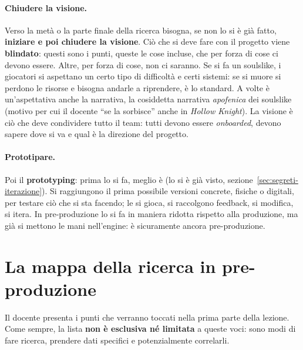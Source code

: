 \paragraph{Chiudere la visione.} Verso la metà o la parte finale della
ricerca bisogna, se non lo si è già fatto, \textbf{iniziare e poi chiudere la
visione}. Ciò che si deve fare con il progetto viene \textbf{blindato}:
questi sono i punti, queste le cose incluse, che per forza di cose ci devono
essere. Altre, per forza di cose, non ci saranno. Se si fa un soulslike, i
giocatori si aspettano un certo tipo di difficoltà e certi sistemi: se si
muore si perdono le risorse e bisogna andarle a riprendere, è lo standard. A
volte è un'aspettativa anche la narrativa, la cosiddetta narrativa
\emph{apofenica} dei soulslike (motivo per cui il docente ``se la sorbisce''
anche in \emph{Hollow Knight}). La visione è ciò che deve condividere tutto il
team: tutti devono essere \emph{onboarded}, devono sapere dove si va e qual è
la direzione del progetto.

\paragraph{Prototipare.} Poi il \textbf{prototyping}: prima lo si fa, meglio
è (lo si è già visto, sezione~\ref{sec:segreti-iterazione}). Si raggiungono il
prima possibile versioni concrete, fisiche o digitali, per testare ciò che si
sta facendo; le si gioca, si raccolgono feedback, si modifica, si itera. In
pre-produzione lo si fa in maniera ridotta rispetto alla produzione, ma già si
mettono le mani nell'engine: è sicuramente ancora pre-produzione.

\section{La mappa della ricerca in pre-produzione}
\label{sec:mappa-ricerca}

Il docente presenta i punti che verranno toccati nella prima parte della
lezione. Come sempre, la lista \textbf{non è esclusiva né limitata} a queste
voci: sono modi di fare ricerca, prendere dati specifici e potenzialmente
correlarli.

